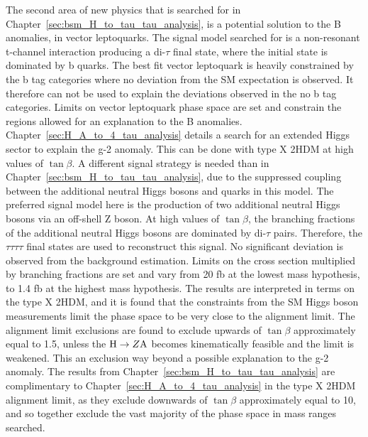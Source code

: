 The second area of new physics that is searched for in Chapter~\ref{sec:bsm_H_to_tau_tau_analysis}, is a potential solution to the B anomalies, in vector leptoquarks.
The signal model searched for is a non-resonant t-channel interaction producing a di-$\tau$ final state, where the initial state is dominated by b quarks.
The best fit vector leptoquark is heavily constrained by the b tag categories where no deviation from the \ac{SM} expectation is observed.
It therefore can not be used to explain the deviations observed in the no b tag categories.
Limits on vector leptoquark phase space are set and constrain the regions allowed for an explanation to the B anomalies. \\

Chapter~\ref{sec:H_A_to_4_tau_analysis} details a search for an extended Higgs sector to explain the g-2 anomaly.
This can be done with type X \ac{2HDM} at high values of $\tan\beta$.
A different signal strategy is needed than in Chapter~\ref{sec:bsm_H_to_tau_tau_analysis}, due to the suppressed coupling between the additional neutral Higgs bosons and quarks in this model.
The preferred signal model here is the production of two additional neutral Higgs bosons via an off-shell Z boson.
At high values of $\tan\beta$, the branching fractions of the additional neutral Higgs bosons are dominated by di-$\tau$ pairs.
Therefore, the $\tau\tau\tau\tau$ final states are used to reconstruct this signal.
No significant deviation is observed from the background estimation.
Limits on the cross section multiplied by branching fractions are set and vary from 20 fb at the lowest mass hypothesis, to 1.4 fb at the highest mass hypothesis.
The results are interpreted in terms on the type X \ac{2HDM}, and it is found that the constraints from the \ac{SM} Higgs boson measurements limit the phase space to be very close to the alignment limit.
The alignment limit exclusions are found to exclude upwards of $\tan\beta$ approximately equal to 1.5, unless the ${\text{H}} \rightarrow Z{\text{A}}$ becomes kinematically feasible and the limit is weakened.
This an exclusion way beyond a possible explanation to the g-2 anomaly.
The results from Chapter~\ref{sec:bsm_H_to_tau_tau_analysis} are complimentary to Chapter~\ref{sec:H_A_to_4_tau_analysis} in the type X \ac{2HDM} alignment limit, as they exclude downwards of $\tan\beta$ approximately equal to 10, and so together exclude the vast majority of the phase space in mass ranges searched.

